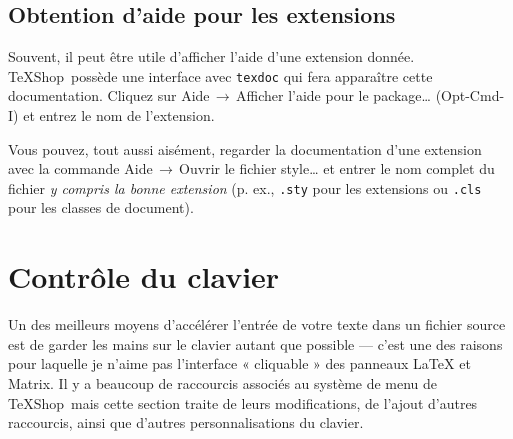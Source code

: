 \documentclass[11pt,french]{article}
\newcommand{\TS}{\textsf{\TeX Shop}}
\newcommand{\cmd}[1]{\textsf{#1}}
\newcommand{\mnu}[1]{\textsf{#1}}
\newcommand{\To}{\,\(\to\)\,}
\begin{document}
\subsection{Obtention d'aide pour les extensions}

Souvent, il peut être utile d'afficher l'aide d'une extension donnée. \TS\ possède une interface avec \texttt{texdoc} qui fera apparaître cette documentation. Cliquez sur \mnu{Aide}\To\mnu{Afficher l'aide pour le package…} (\cmd{Opt-Cmd-I}) et entrez le nom de l'extension.

Vous pouvez, tout aussi aisément, regarder la documentation d'une extension avec la commande \mnu{Aide}\To\mnu{Ouvrir le fichier style…} et entrer le nom complet du fichier \emph{y compris la bonne extension} (p. ex., \texttt{.sty} pour les extensions ou \texttt{.cls} pour les classes de document).

%

\section{Contrôle du clavier}

Un des meilleurs moyens d'accélérer l'entrée de votre texte dans un fichier source est de garder les mains sur le clavier autant que possible --- c'est une des raisons pour laquelle je n'aime pas l'interface « cliquable » des panneaux \LaTeX{} et Matrix. Il y a beaucoup de raccourcis associés au système de menu de \TS\ mais cette section traite de leurs modifications, de l'ajout d'autres raccourcis, ainsi que d'autres personnalisations du clavier.
\end{document}
